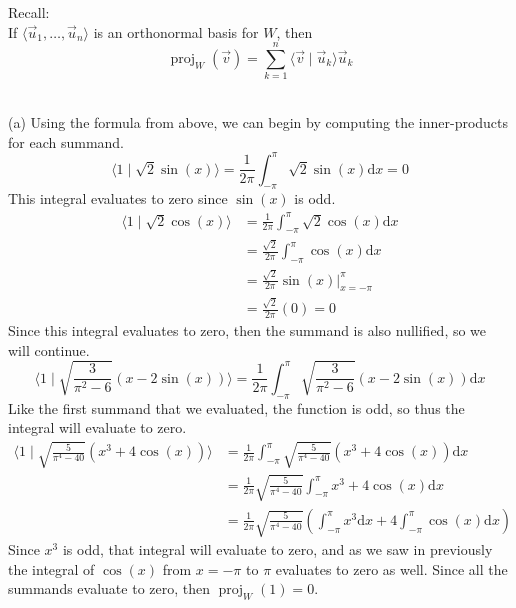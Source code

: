 \documentclass{report}
\begin{document}
\begin{note}
Recall: \\
If $\langle \vec{u}_1, \ldots, \vec{u}_n \rangle$ is an orthonormal basis for $W$, then
$$
\operatorname{proj}_W(\vec{v}) = \sum_{k=1}^n \langle \vec{v} \mid \vec{u}_k \rangle \vec{u}_k
$$
\end{note}
\sol \\
(a)
Using the formula from above, we can begin by computing the inner-products for each summand.
$$
\langle 1 \mid \sqrt{2}\sin(x) \rangle = \frac{1}{2\pi} \int_{-\pi}^\pi \sqrt{2}\sin(x)\mathrm{d}x = 0
$$
This integral evaluates to zero since $\sin(x)$ is odd.
$$
\begin{aligned}
\langle 1 \mid \sqrt{2}\cos(x) \rangle &= \frac{1}{2\pi} \int_{-\pi}^\pi  \sqrt{2}\cos(x)\mathrm{d}x\\
&=\frac{\sqrt{2}}{2\pi} \int_{-\pi}^\pi \cos(x)\mathrm{d}x\\
&=\frac{\sqrt{2}}{2\pi} \sin(x)\biggr\rvert_{x=-\pi}^\pi\\
&=\frac{\sqrt{2}}{2\pi}(0) = 0
\end{aligned}
$$
Since this integral evaluates to zero, then the summand is also nullified, so we will continue.
$$
 \langle 1 \mid \sqrt{\frac{3}{\pi^2-6}}(x-2\sin(x)) \rangle = \frac{1}{2\pi} \int_{-\pi}^\pi \sqrt{\frac{3}{\pi^2-6}}(x-2\sin(x))\mathrm{d}x
$$
Like the first summand that we evaluated, the function is odd, so thus the integral will evaluate to zero.
$$
\begin{aligned}
\langle 1 \mid \sqrt{\frac{5}{\pi^4-40}}(x^3+4\cos(x))\rangle &=  \frac{1}{2\pi} \int_{-\pi}^\pi\sqrt{\frac{5}{\pi^4-40}}(x^3+4\cos(x))\mathrm{d}x\\
&=\frac{1}{2\pi}\sqrt{\frac{5}{\pi^4-40}} \int_{-\pi}^\pi x^3 + 4\cos(x)\mathrm{d}x\\
&=\frac{1}{2\pi}\sqrt{\frac{5}{\pi^4-40}} \left(\int_{-\pi}^\pi x^3\mathrm{d}x + 4\int_{-\pi}^\pi\cos(x)\mathrm{d}x\right)
\end{aligned}
$$
Since $x^3$ is odd, that integral will evaluate to zero, and as we saw in previously the integral of $\cos(x)$ from $x=-\pi$ to $\pi$ evaluates to zero as well. Since all the summands evaluate to zero, then $\operatorname{proj}_W(1) = 0$. \\
\end{document}
